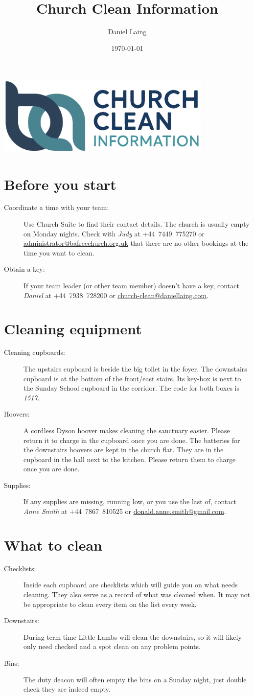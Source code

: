 \documentclass[a4paper, 12pt, final, oneside]{article}
\title{Church Clean Information}
\author{Daniel Laing}
\date{\today}
\renewcommand\maketitle{%
    \hfill\includegraphics[width=0.8\textwidth]{title_img.png}\hfill%
}
\newcommand\email[1]{\href{mailto:#1}{\underline{#1}}}
\begin{document}
\maketitle{}

\section*{Before you start}
\begin{description}
    \item[Coordinate a time with your team:] Use Church Suite to find their contact details. The church is usually empty
        on Monday nights. Check with \emph{Judy} at +44~7449~775270 or \email{administrator@bafreechurch.org.uk} that
        there are no other bookings at the time you want to clean.
    \item[Obtain a key:] If your team leader (or other team member) doesn't have a key, contact \emph{Daniel} at
        +44~7938~728200 or \email{church-clean@daniellaing.com}.
\end{description}

\section*{Cleaning equipment}
\begin{description}
    \item[Cleaning cupboards:] The upstairs cupboard is beside the big toilet in the foyer. The downstairs cupboard is
        at the bottom of the front/east stairs. Its key-box is next to the Sunday School cupboard in the corridor. The
        code for both boxes is \emph{1517}.
    \item[Hoovers:] A cordless Dyson hoover makes cleaning the sanctuary easier. Please return it to charge in the
        cupboard once you are done. The batteries for the downstairs hoovers are kept in the church flat. They are in
        the cupboard in the hall next to the kitchen. Please return them to charge once you are done.
    \item[Supplies:] If any supplies are missing, running low, or you use the last of, contact \emph{Anne Smith} at
        +44~7867~810525 or \email{donald.anne.smith@gmail.com}.
\end{description}

\section*{What to clean}
\begin{description}
    \item[Checklists:] Inside each cupboard are checklists which will guide you on what needs cleaning. They also serve
        as a record of what was cleaned when. It may not be appropriate to clean every item on the list every week.
    \item[Downstairs:] During term time Little Lambs will clean the downstairs, so it will likely only need checked
        and a spot clean on any problem points.
    \item[Bins:] The duty deacon will often empty the bins on a Sunday night, just double check they are indeed empty.
\end{description}
\end{document}
